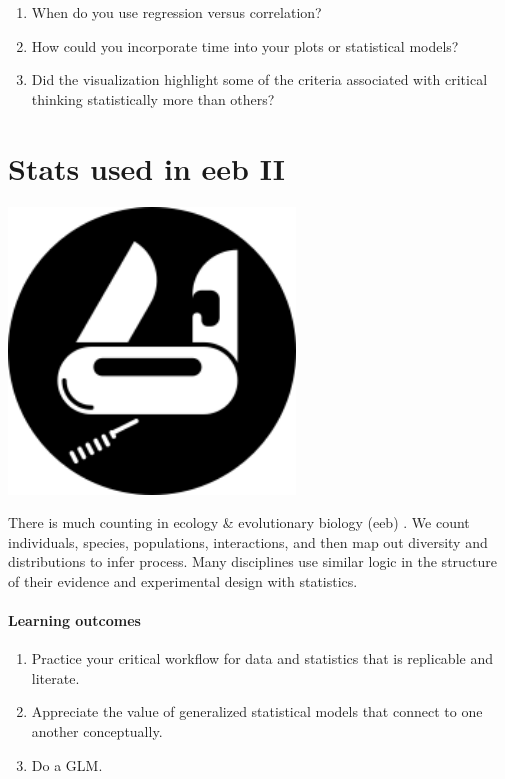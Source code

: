\documentclass[
]{book}
\providecommand{\tightlist}{%
  \setlength{\itemsep}{0pt}\setlength{\parskip}{0pt}}
\begin{document}
\begin{enumerate}
\def\labelenumi{\arabic{enumi}.}
\tightlist
\item
  When do you use regression versus correlation?\\
\item
  How could you incorporate time into your plots or statistical models?\\
\item
  Did the visualization highlight some of the criteria associated with critical thinking statistically more than others?
\end{enumerate}

\hypertarget{eebII}{%
\chapter{Stats used in eeb II}\label{eebII}}

\includegraphics[width=3in,height=\textheight]{./eebII.png}

There is much counting in ecology \& evolutionary biology (eeb) \citep{RN7219}. We count individuals, species, populations, interactions, and then map out diversity and distributions to infer process. Many disciplines use similar logic in the structure of their evidence and experimental design with statistics.

\hypertarget{learning-outcomes-4}{%
\subsubsection*{Learning outcomes}\label{learning-outcomes-4}}

\begin{enumerate}
\def\labelenumi{\arabic{enumi}.}
\tightlist
\item
  Practice your critical workflow for data and statistics that is replicable and literate.\\
\item
  Appreciate the value of generalized statistical models that connect to one another conceptually.\\
\item
  Do a GLM.
\end{enumerate}
\end{document}
